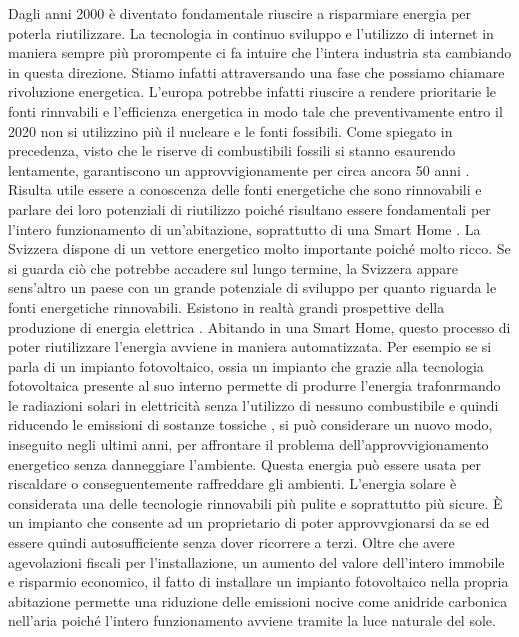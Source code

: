 Dagli anni 2000 è diventato fondamentale riuscire a risparmiare energia per poterla riutilizzare. La tecnologia in continuo sviluppo e l’utilizzo di internet in maniera sempre più prorompente ci fa intuire che l’intera industria sta cambiando in questa direzione. 
Stiamo infatti attraversando una fase che possiamo chiamare rivoluzione energetica. L’europa potrebbe infatti riuscire a rendere prioritarie le fonti rinnvabili e l’efficienza energetica in modo tale che  preventivamente entro il 2020 non si utilizzino più il nucleare e le fonti fossibili. Come spiegato in precedenza, visto che le riserve di combustibili fossili si stanno esaurendo lentamente, garantiscono un approvvigionamente per circa ancora 50 anni . Risulta utile essere a conoscenza delle fonti energetiche che sono rinnovabili e parlare dei loro potenziali di riutilizzo poiché risultano essere fondamentali per l’intero funzionamento di un’abitazione, soprattutto di una Smart Home . La Svizzera dispone di un vettore energetico molto importante poiché molto ricco. Se si guarda ciò che potrebbe accadere sul lungo termine, la Svizzera appare sens’altro un paese con un grande potenziale di sviluppo per quanto riguarda le fonti energetiche rinnovabili. Esistono in realtà grandi prospettive della produzione di energia elettrica .
Abitando in una Smart Home, questo processo di poter riutilizzare l’energia avviene in maniera automatizzata. Per esempio se si parla di un impianto fotovoltaico, ossia un impianto che grazie alla tecnologia fotovoltaica presente al suo interno permette di produrre l’energia trafonrmando le radiazioni solari in elettricità senza l’utilizzo di nessuno combustibile e quindi riducendo le emissioni di sostanze tossiche , si può considerare un nuovo modo, inseguito negli ultimi anni, per affrontare il problema dell’approvvigionamento energetico senza danneggiare l’ambiente. Questa energia può essere usata per riscaldare o conseguentemente raffreddare gli ambienti.
L’energia solare è considerata una delle tecnologie rinnovabili più pulite e soprattutto più sicure. È un impianto che consente ad un proprietario di poter approvvgionarsi da se ed essere quindi autosufficiente senza dover ricorrere a terzi. Oltre che avere agevolazioni fiscali per l’installazione, un aumento del valore dell’intero immobile e risparmio economico, il fatto di installare un impianto fotovoltaico nella propria abitazione permette una riduzione delle emissioni nocive come anidride carbonica nell’aria poiché l’intero funzionamento avviene tramite la luce naturale del sole.
